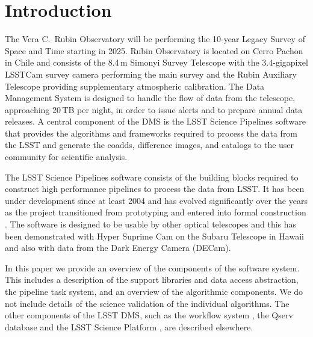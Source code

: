 \section{Introduction}

The Vera C.\ Rubin Observatory will be performing the 10-year Legacy Survey of Space and Time \citep[LSST;][]{2019ApJ...873..111I} starting in 2025.
Rubin Observatory is located on Cerro Pachon in Chile and consists of the 8.4\,m Simonyi Survey Telescope with the 3.4-gigapixel LSSTCam survey camera performing the main survey and the Rubin Auxiliary Telescope providing supplementary atmospheric calibration.
The Data Management System \citep[DMS;][]{2022arXiv221113611O} is designed to handle the flow of data from the telescope, approaching 20\,TB per night, in order to issue alerts and to prepare annual data releases.
A central component of the DMS is the LSST Science Pipelines software that provides the algorithms and frameworks required to process the data from the LSST and generate the coadds, difference images, and catalogs to the user community for scientific analysis.

The LSST Science Pipelines software consists of the building blocks required to construct high performance pipelines to process the data from LSST.
It has been under development since at least 2004 \citep{2004AAS...20510811A} and has evolved significantly over the years as the project transitioned from prototyping \citep{2010SPIE.7740E..15A} and entered into formal construction \citep{2017ASPC..512..279J}.
The software is designed to be usable by other optical telescopes and this has been demonstrated with Hyper Suprime Cam on the Subaru Telescope in Hawaii\citep{2018PASJ...70S...5B} and also with data from the Dark Energy Camera (DECam).

In this paper we provide an overview of the components of the software system.
This includes a description of the support libraries and data access abstraction, the pipeline task system, and an overview of the algorithmic components.
We do not include details of the science validation of the individual algorithms.
The other components of the LSST DMS, such as the workflow system \citep{2022arXiv221115795G}, the Qserv database \citep{Wang:2011:QDS:2063348.2063364} and the LSST Science Platform \citep{LSE-319}, are described elsewhere.

